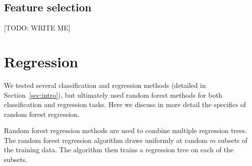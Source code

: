 \documentclass{article} %
\begin{document}
\subsection{Feature selection}
\label{sec:featureselection}

[TODO: WRITE ME]






\section{Regression}
\label{sec:regression}

We tested several classification and regression methods (detailed in Section~\ref{sec:intro}), but ultimately used random forest methods for both classification and regression tasks. Here we discuss in more detail the specifics of random forest regression.

Random forest regression methods are used to combine multiple regression trees. The random forest regression algorithm draws uniformly at random $m$ subsets of the training data. The algorithm then trains a regression tree on each of the subsets.
\end{document}
